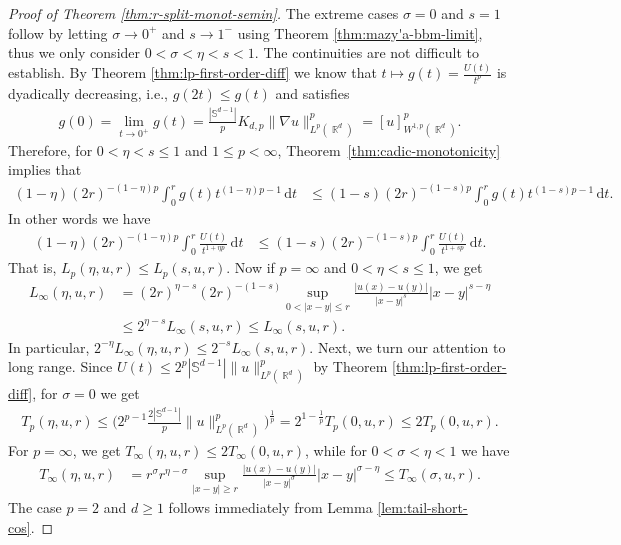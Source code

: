 \documentclass[12pt, reqno]{amsart}%
\theoremstyle{plain}  %
\theoremstyle{definition}  %
\theoremstyle{remark}
\numberwithin{equation}{section}
\DeclareMathOperator{\R}{\mathbb{R}}
\renewcommand{\d}{\,\mathrm{d}}
\begin{document}
\begin{proof}[Proof of Theorem \ref{thm:r-split-monot-semin}]
 The extreme cases $\sigma=0$ and $s=1$ follow by letting $\sigma\to 0^+$ and $s\to1^-$ using Theorem \ref{thm:mazy'a-bbm-limit}, thus we only consider $0<\sigma<\eta<s<1$.
The continuities are not difficult to establish. By Theorem \ref{thm:lp-first-order-diff}
we know that $t \mapsto g(t) = \frac{U(t)}{t^p}$ is dyadically decreasing, i.e.,  $g(2t) \leq g(t)$ and satisfies
\begin{align*}
g(0)=\lim_{t\to0^+} g(t)= \frac{|\mathbb{S}^{d-1}|}{p}K_{d,p} \|\nabla u\|^p_{L^p(\R^d)} =[u]^p_{W^{1,p}(\R^d)}.
\end{align*}
Therefore,  for $0<\eta<s\leq 1$ and $1\leq p<\infty$,  Theorem~\ref{thm:cadic-monotonicity} implies that
\begin{align*}
(1-\eta)(2r)^{-(1-\eta )p}\int_0^r g(t)t^{(1-\eta) p-1} \d t
&\leq (1-s) (2r)^{-(1-s) p}\int_0^r g(t)t^{(1-s) p-1}\d t.
\end{align*}
In other words we have
\begin{align*}
(1-\eta)(2r)^{-(1-\eta) p}\int_0^r \frac{U(t)}{t^{1+\eta p}} \d t
&\leq (1-s) (2r)^{-(1-s) p}\int_0^r \frac{U(t)}{t^{1+s p}}\d t.
\end{align*}
That is, $L_p(\eta, u,r) \leq L_p(s, u,r)$. Now if $p=\infty$  and $0<\eta<s\leq  1$, we get
\begin{align*}
L_\infty(\eta, u,r)&=
(2r)^{\eta-s} (2r)^{-(1-s)} \sup_{0<|x-y|\leq r} \frac{|u(x)-u(y)|}{|x-y|^s} |x-y|^{s-\eta}\\
&\leq 2^{\eta-s}L_\infty(s, u,r)\leq L_\infty(s, u,r).
\end{align*}
In particular, $ 2^{-\eta}L_\infty(\eta, u,r) \leq 2^{-s}L_\infty(s, u,r)$. 
Next,  we turn our attention to long range. Since   $U(t)\leq 2^p |\mathbb{S}^{d-1}| \|u\|^p_{L^p(\R^d)}$ by Theorem \ref{thm:lp-first-order-diff}, for $\sigma=0$ we get 
\begin{align*}
T_p(\eta, u,r)\leq \Big(2^{p-1}\frac{2|\mathbb{S}^{d-1}|}{p}\|u\|^p_{L^p(\R^d)}
\Big)^{\frac{1}{p}}=2^{1-\frac{1}{p}}T_p(0, u,r)\leq 2T_p(0, u,r).
\end{align*}
For  $p=\infty$,  we get  $T_\infty(\eta, u, r)\leq 2T_\infty(0, u,r)$, while for $0<\sigma<\eta<1$ we have
\begin{align*}
T_\infty(\eta, u,r)&= r^{\sigma}r^{\eta-\sigma}\sup_{|x-y|\geq r} \frac{|u(x)-u(y)|}{|x-y|^{\sigma}}|x-y|^{\sigma-\eta} \leq T_\infty(\sigma, u,r).
\end{align*}
The case $p=2$ and $d\geq 1$ follows immediately from Lemma \ref{lem:tail-short-cos}.

\end{proof}
\end{document}
